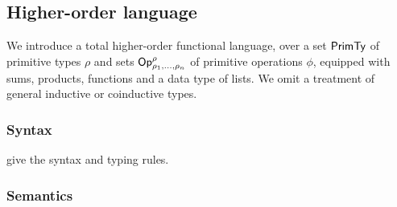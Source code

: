 \subsection{Higher-order language}

We introduce a total higher-order functional language, over a set $\mathsf{PrimTy}$ of primitive types $\rho$ and sets
$\mathsf{Op}^\rho_{\rho_1,\ldots,\rho_n}$ of primitive operations $\phi$, equipped with sums, products, functions
and a data type of lists. We omit a treatment of general inductive or coinductive types.

\subsubsection{Syntax}
\label{sec:language:syntax}


% 


 give the syntax and typing rules.

\subsubsection{Semantics}
\label{sec:language:semantics}

% 
% 


%

